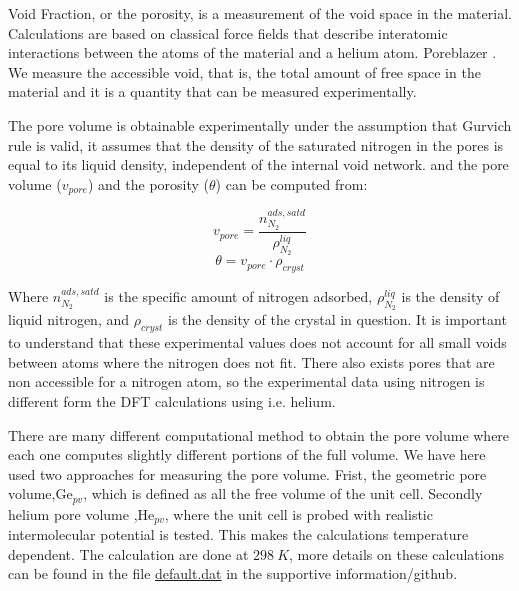 	Void Fraction, or the porosity, is a measurement of the void space in the material. Calculations are based on classical force fields that describe interatomic interactions between the atoms of the material and a helium atom. Poreblazer \cite{ongari2017accurate}. We measure the accessible void, that is, the total amount of free space in the material and it is a quantity that can be measured experimentally. 
			
	The pore volume is obtainable experimentally under the assumption that Gurvich rule is valid, it assumes that the density of the saturated nitrogen in the pores is equal to its liquid density, independent of the internal void network. 
and the pore volume ($v_{pore}$) and the porosity ($\theta$) can be  computed from:

\begin{equation}
v_{pore} = \frac{n^{ads,satd}_{N_2}}{\rho^{liq}_{N_2}}
\end{equation}
\begin{equation}
\theta = v_{pore} \cdot \rho_{cryst}
\end{equation} 

	Where $n^{ads,satd}_{N_2}$ is the specific amount of nitrogen adsorbed, $\rho^{liq}_{N_2}$ is the density of liquid nitrogen, and $\rho_{cryst}$ is the density of the crystal in question. It is important to understand that these experimental values does not account for all small voids between atoms where the nitrogen does not fit. There also exists pores that are non accessible for a nitrogen atom, so the experimental data using nitrogen is different form the DFT calculations using i.e. helium.

	There are many different computational method to obtain the pore volume where each one computes slightly different portions of the full volume. We have here used two approaches for measuring the pore volume. Frist, the geometric pore volume,$\text{Ge}_{pv}$, which is defined as all the free volume of the unit cell. Secondly helium pore volume ,$\text{He}_{pv}$, where the unit cell is probed with realistic intermolecular potential is tested. This makes the calculations temperature dependent. The calculation are done at $\SI{298}{K}$, more details on these calculations can be found in the file \href{https://github.com/sondrt/Creten_Stuff/blob/master/defaults.dat}{default.dat} in the supportive information/github.

